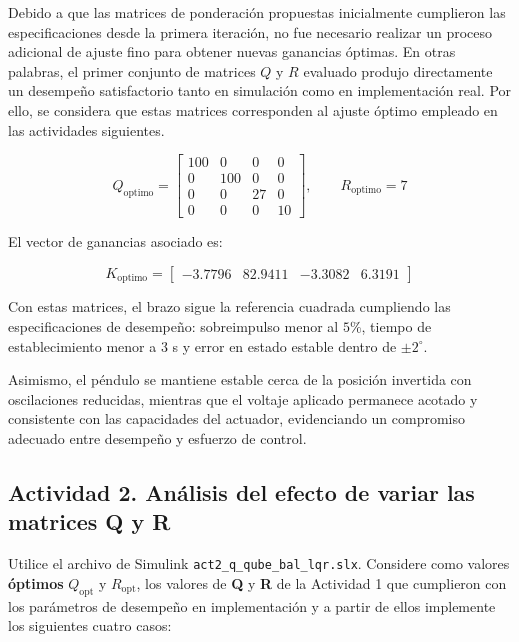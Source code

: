 \noindent Debido a que las matrices de ponderación propuestas inicialmente  cumplieron las especificaciones desde la primera iteración, no fue necesario realizar un proceso adicional de ajuste fino para obtener nuevas ganancias óptimas. En otras palabras, el primer conjunto de matrices $Q$ y $R$ evaluado produjo directamente un desempeño satisfactorio tanto en simulación como en implementación real. Por ello, se considera que estas matrices corresponden al ajuste óptimo empleado en las actividades siguientes.

\begin{equation}
Q_{\text{optimo}} = 
\begin{bmatrix}
100 & 0 & 0 & 0 \\
0 & 100 & 0 & 0 \\
0 & 0 & 27 & 0 \\
0 & 0 & 0 & 10
\end{bmatrix},
\qquad
R_{\text{optimo}} = 7
\end{equation}

\noindent El vector de ganancias asociado es:

\begin{equation}
K_{\text{optimo}} =
\begin{bmatrix}
-3.7796 & 82.9411 & -3.3082 & 6.3191
\end{bmatrix}
\end{equation}

\noindent Con estas matrices, el brazo sigue la referencia cuadrada cumpliendo las especificaciones de desempeño: sobreimpulso menor al $5\%$, tiempo de establecimiento menor a $3$ s y error en estado estable dentro de $\pm 2^\circ$.

\noindent Asimismo, el péndulo se mantiene estable cerca de la posición invertida con oscilaciones reducidas, mientras que el voltaje aplicado permanece acotado y consistente con las capacidades del actuador, evidenciando un compromiso adecuado entre desempeño y esfuerzo de control.


\subsection*{Actividad 2. Análisis del efecto de variar las matrices Q y R}

Utilice el archivo de Simulink \texttt{act2\_q\_qube\_bal\_lqr.slx}. Considere como valores \textbf{óptimos} $Q_{\text{opt}}$ y $R_{\text{opt}}$,  los valores de \textbf{Q} y \textbf{R} de la Actividad 1 que cumplieron con los parámetros de desempeño en implementación y a partir de ellos implemente los siguientes cuatro casos:

